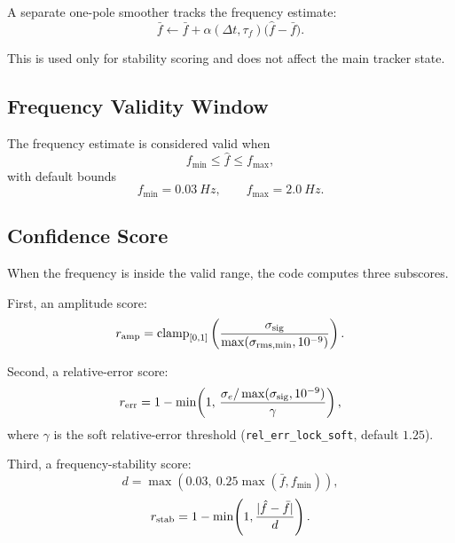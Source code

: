 \documentclass[conference]{IEEEtran}
\begin{document}
    A separate one-pole smoother tracks the frequency estimate:
    \begin{equation}
        \bar f \leftarrow \bar f
        + \alpha(\Delta t,\tau_f)\bigl(\hat f - \bar f\bigr).
    \end{equation}

    This is used only for stability scoring and does not affect the main tracker
    state.

    \subsection{Frequency Validity Window}

    The frequency estimate is considered valid when
    \begin{equation}
        f_{\min} \le \hat f \le f_{\max},
    \end{equation}
    with default bounds
    \begin{equation}
        f_{\min} = \SI{0.03}{Hz}, \qquad
        f_{\max} = \SI{2.0}{Hz}.
    \end{equation}

    \subsection{Confidence Score}

    When the frequency is inside the valid range, the code computes three
    subscores.

    First, an amplitude score:
    \begin{equation}
        r_{\rm amp} =
        \operatorname{clamp}_{[0,1]}
        \left(
        \frac{\sigma_{\rm sig}}
        {\max(\sigma_{\rm rms,min},10^{-9})}
        \right).
    \end{equation}

    Second, a relative-error score:
    \begin{equation}
        r_{\rm err} =
        1-\min\!\left(
        1,\,
        \frac{\sigma_e / \max(\sigma_{\rm sig},10^{-9})}
        {\gamma}
        \right),
    \end{equation}
    where $\gamma$ is the soft relative-error threshold
    (\texttt{rel\_err\_lock\_soft}, default $1.25$).

    Third, a frequency-stability score:
    \begin{equation}
        d = \max\!\left(0.03,\ 0.25\max(\bar f,f_{\min})\right),
    \end{equation}
    \begin{equation}
        r_{\rm stab} =
        1-\min\!\left(1,\frac{|\hat f-\bar f|}{d}\right).
    \end{equation}
\end{document}
